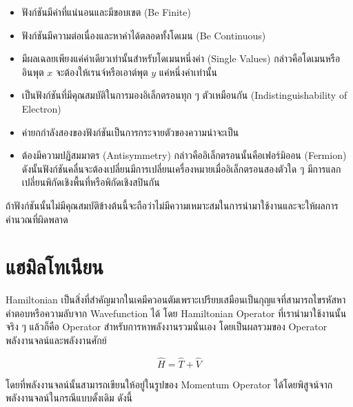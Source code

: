 \begin{itemize}[topsep=0pt]
    \item ฟังก์ชันมีค่าที่แน่นอนและมีขอบเขต (Be Finite)
    
    \item ฟังก์ชันมีความต่อเนื่องและหาค่าได้ตลอดทั้งโดเมน (Be Continuous)
    
    \item มีผลเฉลยเพียงแค่ค่าเดียวเท่านั้นสำหรับโดเมนหนึ่งค่า (Single Values) กล่าวคือโดเมนหรืออินพุต $x$ จะต้องให้เรนจ์หรือเอาต์พุต 
    $y$ แค่หนึ่งค่าเท่านั้น
    
    \item เป็นฟังก์ชันที่มีคุณสมบัติในการมองอิเล็กตรอนทุก ๆ ตัวเหมือนกัน (Indistinguishability of Electron)
    
    \item ค่ายกกำลังสองของฟังก์ชันเป็นการกระจายตัวของความน่าจะเป็น
    
    \item ต้องมีความปฏิสมมาตร (Antisymmetry) กล่าวคืออิเล็กตรอนนั้นคือเฟอร์มิออน (Fermion)\autocite{atkins2010} 
    ดังนั้นฟังก์ชันคลื่นจะต้องเปลี่ยนมีการเปลี่ยนเครื่องหมายเมื่ออิเล็กตรอนสองตัวใด ๆ มีการแลกเปลี่ยนพิกัดเชิงพื้นที่หรือพิกัดเชิงสปินกัน
\end{itemize}

ถ้าฟังก์ชันนั้นไม่มีคุณสมบัติข้างต้นนี้จะถือว่าไม่มีความเหมาะสมในการนำมาใช้งานและจะให้ผลการคำนวณที่ผิดพลาด

\section{แฮมิลโทเนียน}
\label{sec:hamiltonian}

Hamiltonian เป็นสิ่งที่สำคัญมากในเคมีควอนตัมเพราะเปรียบเสมือนเป็นกุญแจที่สามารถไขรหัสหาคำตอบหรือความลับจาก Wavefunction ได้
โดย Hamiltonian Operator ที่เรานำมาใช้งานนั้นจริง ๆ แล้วก็คือ Operator สำหรับการหาพลังงานรวมนั่นเอง โดยเป็นผลรวมของ Operator 
พลังงานจลน์และพลังงานศักย์

\begin{equation}\label{eq:hamil}
    \hat{H} = \hat{T} + \hat{V}
\end{equation}

\noindent โดยที่พลังงานจลน์นั้นสามารถเขียนให้อยู่ในรูปของ Momentum Operator ได้โดยพิสูจน์จากพลังงานจลน์ในกรณีแบบดั้งเดิม ดังนี้

